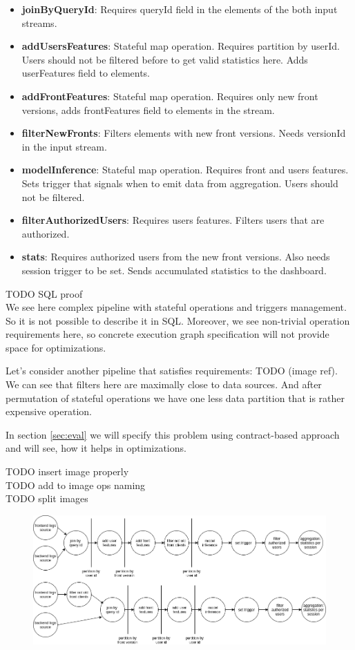 \begin{itemize}
    \item \textbf{joinByQueryId}: Requires queryId field in the elements of the both input streams.
    \item \textbf{addUsersFeatures}: Stateful map operation. Requires partition by userId. Users should not be filtered before to get valid statistics here. Adds userFeatures field to elements.
    \item \textbf{addFrontFeatures}: Stateful map operation. Requires only new front versions, adds frontFeatures field to elements in the stream.
    \item \textbf{filterNewFronts}: Filters elements with new front versions. Needs versionId in the input stream.
    \item \textbf{modelInference}: Stateful map operation. Requires front and users features. Sets trigger that signals when to emit data from aggregation. Users should not be filtered.
    \item \textbf{filterAuthorizedUsers}: Requires users features. Filters users that are authorized.
    \item \textbf{stats}: Requires authorized users from the new front versions. Also needs session trigger to be set. Sends accumulated statistics to the dashboard.
\end{itemize}

TODO SQL proof\\
We see here complex pipeline with stateful operations and triggers management.
So it is not possible to describe it in SQL.
Moreover, we see non-trivial operation requirements here, so concrete execution graph specification will not provide space for optimizations.

Let's consider another pipeline that satisfies requirements: TODO (image ref).
We can see that filters here are maximally close to data sources.
And after permutation of stateful operations we have one less data partition that is rather expensive operation.

In section \ref{sec:eval} we will specify this problem using contract-based approach and will see, how it helps in optimizations.

TODO insert image properly \\
TODO add to image ops naming \\
TODO split images \\
\begin{figure}
    \centering
    \label{fig:running-example-suboptimal}
    \label{fig:running-example-optimal}
    \includegraphics[width=\linewidth]{images/debs-calco-example}
\end{figure}
